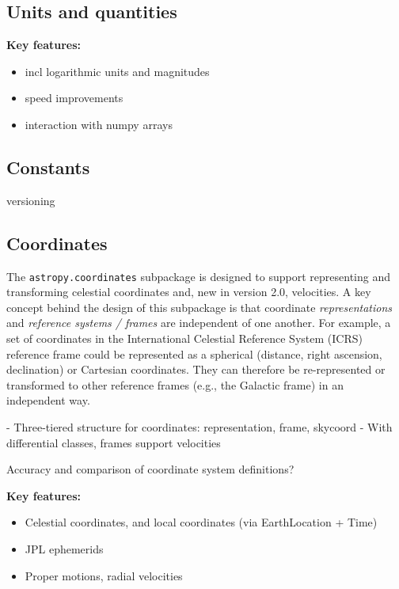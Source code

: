 \documentclass[modern]{aastex61}
\begin{document}

\subsection{Units and quantities}
\label{sec:units}

\textbf{Key features:}
\begin{itemize}
	\item incl logarithmic units and magnitudes
	\item speed improvements
    \item interaction with numpy arrays
\end{itemize}

\subsection{Constants}
versioning


\subsection{Coordinates}
\label{sec:coordinates}

The \texttt{astropy.coordinates} subpackage is designed to support representing
and transforming celestial coordinates and, new in version 2.0, velocities.
A key concept behind the design of this subpackage is that coordinate
\textit{representations} and \textit{reference systems / frames} are independent
of one another.
For example, a set of coordinates in the International Celestial Reference
System (ICRS) reference frame could be represented as a spherical (distance,
right ascension, declination) or Cartesian coordinates.
They can therefore be re-represented or transformed to other reference frames
(e.g., the Galactic frame) in an independent way.

- Three-tiered structure for coordinates: representation, frame, skycoord
- With differential classes, frames support velocities

Accuracy and comparison of coordinate system definitions?

\textbf{Key features:}
\begin{itemize}
	\item Celestial coordinates, and local coordinates (via EarthLocation + Time)
	\item JPL ephemerids
    \item Proper motions, radial velocities
\end{itemize}
\end{document}
